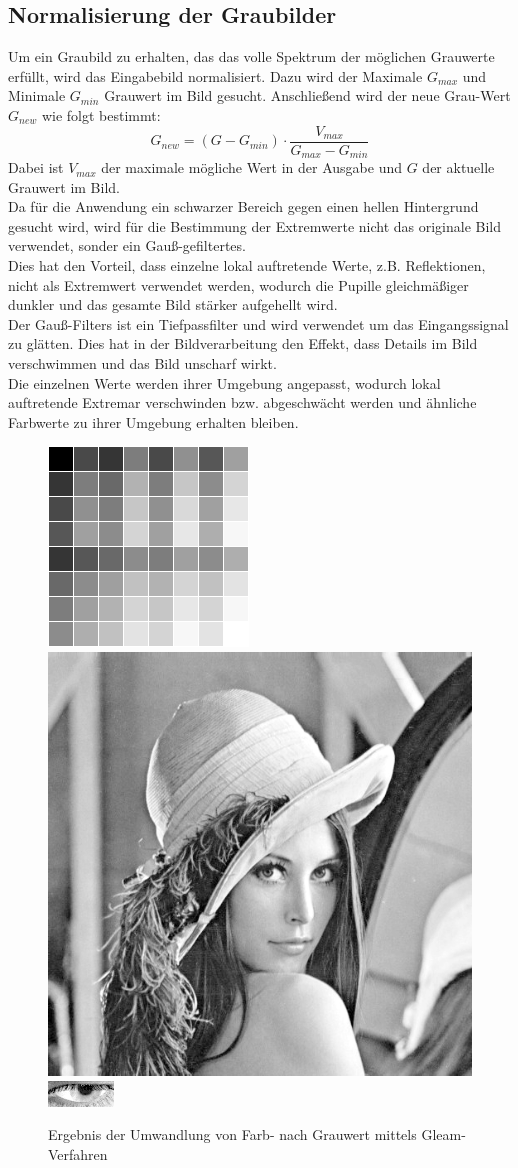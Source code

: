 \subsection{Normalisierung der Graubilder}
Um ein Graubild zu erhalten, das das volle Spektrum der möglichen Grauwerte erfüllt, wird das Eingabebild normalisiert. Dazu wird der Maximale $G_{max}$ und Minimale $G_{min}$ Grauwert im Bild gesucht. Anschließend wird der neue Grau-Wert $G_{new}$ wie folgt bestimmt:
\[G_{new} = (G-G_{min})\cdot \dfrac{V_{max}}{G_{max}-G_{min}}\]
Dabei ist $V_{max}$ der maximale mögliche Wert in der Ausgabe und $G$ der aktuelle Grauwert im Bild.\\
Da für die Anwendung ein schwarzer Bereich gegen einen hellen Hintergrund gesucht wird, wird für die Bestimmung der Extremwerte nicht das originale Bild verwendet, sonder ein Gauß-gefiltertes.\\
Dies hat den Vorteil, dass einzelne lokal auftretende Werte, z.B. Reflektionen, nicht als Extremwert verwendet werden, wodurch die Pupille gleichmäßiger dunkler und das gesamte Bild stärker aufgehellt wird.\\
Der Gauß-Filters ist ein Tiefpassfilter und wird verwendet um das Eingangssignal zu glätten. Dies hat in der Bildverarbeitung den Effekt, dass Details im Bild verschwimmen und das Bild unscharf wirkt.\\
Die einzelnen Werte werden ihrer Umgebung angepasst, wodurch lokal auftretende Extremar verschwinden bzw. abgeschwächt werden und ähnliche Farbwerte zu ihrer Umgebung erhalten bleiben.
\begin{figure}
	\centering
	\includegraphics[width=0.2\linewidth]{img/Farbkarte2}
	\includegraphics[width=0.2\linewidth]{img/Lena2}
	\includegraphics[width=0.2\linewidth]{img/Auge_2Gray}
	\caption{Ergebnis der Umwandlung von Farb- nach Grauwert mittels Gleam-Verfahren}
	\label{img_Gleam}
\end{figure}

